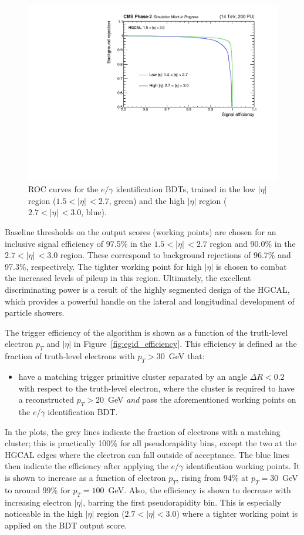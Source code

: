 \begin{figure}[htb!]
  \centering
  \includegraphics[width=.7\textwidth]{Figures/cms/egid/ROC.pdf}
  \caption[$e/\gamma$ identification ROC curve]
  {
    ROC curves for the $e/\gamma$ identification BDTs, trained in the low $|\eta|$ region (${1.5<|\eta|\,<2.7}$, green) and the high $|\eta|$ region ($2.7<|\eta|\,<3.0$, blue).
  }
  \label{fig:egid_roc}
\end{figure}

Baseline thresholds on the output scores (working points) are chosen for an inclusive signal efficiency of 97.5\% in the $1.5<|\eta|\,<2.7$ region and 90.0\% in the $2.7<|\eta|\,<3.0$ region. These correspond to background rejections of 96.7\% and 97.3\%, respectively. The tighter working point for high $|\eta|$ is chosen to combat the increased levels of pileup in this region. Ultimately, the excellent discriminating power is a result of the highly segmented design of the HGCAL, which provides a powerful handle on the lateral and longitudinal development of particle showers.

The trigger efficiency of the algorithm is shown as a function of the truth-level electron $p_T$ and $|\eta|$ in Figure~\ref{fig:egid_efficiency}. This efficiency is defined as the fraction of truth-level electrons with $p_T>30$~GeV that:
\begin{itemize}
    \item have a matching trigger primitive cluster separated by an angle $\Delta R<0.2$ with respect to the truth-level electron, where the cluster is required to have a reconstructed $p_T>20$~GeV \textit{and} pass the aforementioned working points on the $e/\gamma$ identification BDT.
\end{itemize}
\noindent
In the plots, the grey lines indicate the fraction of electrons with a matching cluster; this is practically 100\% for all pseudorapidity bins, except the two at the HGCAL edges where the electron can fall outside of acceptance. The blue lines then indicate the efficiency after applying the $e/\gamma$ identification working points. It is shown to increase as a function of electron $p_T$, rising from 94\% at $p_T=30$~GeV to around 99\% for $p_T=100$~GeV. Also, the efficiency is shown to decrease with increasing electron $|\eta|$, barring the first pseudorapidity bin. This is especially noticeable in the high $|\eta|$ region ($2.7<|\eta|<3.0$) where a tighter working point is applied on the BDT output score.

